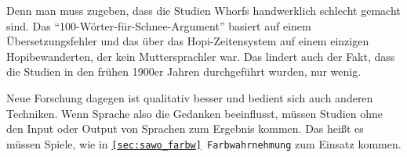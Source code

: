 \documentclass[12pt]{scrreprt}
\begin{document}
Denn man muss zugeben, dass die Studien Whorfs
handwerklich schlecht gemacht sind. Das \enquote{100-Wörter-für-Schnee-Argument}
basiert auf einem Übersetzungsfehler und das über das Hopi-Zeitensystem auf einem
einzigen Hopibewanderten, der kein Muttersprachler war. Das lindert auch der Fakt,
dass die Studien in den frühen 1900er Jahren durchgeführt wurden, nur wenig.

Neue Forschung dagegen ist qualitativ besser und bedient sich auch anderen
Techniken. Wenn Sprache also die Gedanken beeinflusst, müssen Studien ohne den
Input oder Output von Sprachen zum Ergebnis kommen. Das heißt es müssen Spiele,
wie in \texttt{\ref{sec:sawo_farbw} Farbwahrnehmung} zum Einsatz kommen.

\printbibliography
\end{document}

